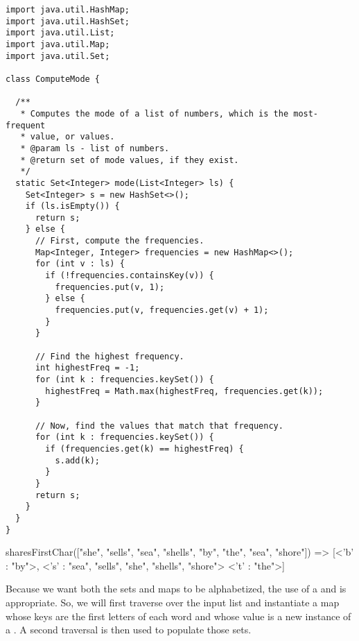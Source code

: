 \begin{cl}[]{}
\begin{lstlisting}[language=MyJava]
import java.util.HashMap;
import java.util.HashSet;
import java.util.List;
import java.util.Map;
import java.util.Set;

class ComputeMode {

  /**
   * Computes the mode of a list of numbers, which is the most-frequent
   * value, or values.
   * @param ls - list of numbers.
   * @return set of mode values, if they exist.
   */
  static Set<Integer> mode(List<Integer> ls) {
    Set<Integer> s = new HashSet<>();
    if (ls.isEmpty()) {
      return s;
    } else {
      // First, compute the frequencies.
      Map<Integer, Integer> frequencies = new HashMap<>();
      for (int v : ls) {
        if (!frequencies.containsKey(v)) {
          frequencies.put(v, 1);
        } else {
          frequencies.put(v, frequencies.get(v) + 1);
        }
      } 

      // Find the highest frequency.
      int highestFreq = -1;
      for (int k : frequencies.keySet()) {
        highestFreq = Math.max(highestFreq, frequencies.get(k));
      }

      // Now, find the values that match that frequency.
      for (int k : frequencies.keySet()) {
        if (frequencies.get(k) == highestFreq) {
          s.add(k);
        }
      }
      return s;
    }
  }
}
\end{lstlisting}
\end{cl}


\begin{verbnobox}[\small]
sharesFirstChar(["she", "sells", "sea", "shells", "by", "the", "sea", "shore"])
  => [<'b' : {"by"}>, 
      <'s' : {"sea", "sells", "she", "shells", "shore"}>
      <'t' : {"the"}>]
\end{verbnobox}

Because we want both the sets and maps to be alphabetized, the use of a  and  is appropriate. So, we will first traverse over the input list and instantiate a map whose keys are the first letters of each word and whose value is a new instance of a . A second traversal is then used to populate those sets.

